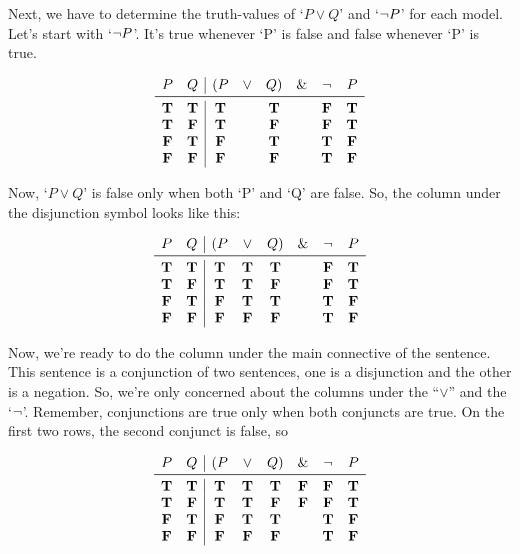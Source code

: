 \documentclass[../logic-text.tex]{subfiles}
\begin{document}
Next, we have to determine the truth-values of \enquote*{\(P \lor Q\)} and \enquote*{\(\neg P\)} for each model.
Let's start with \enquote*{\(\neg P\)}.
It's true whenever \enquote*{P} is false and false whenever \enquote*{P} is true.


\[
  \begin{array}{cc|cccccc}
    P & Q & (P & \lor & Q) & \land & \lneg & P \\ \midrule
    \true & \true & \true&& \true && \false & \true \\
    \true & \false & \true && \false && \false & \true \\
    \false & \true & \false && \true && \true & \false \\
    \false &\false & \false && \false && \true & \false \\
\end{array}
\]

Now, \enquote*{\(P \lor Q\)} is false only when both \enquote*{P} and \enquote*{Q} are false.
So, the column under the disjunction symbol looks like this:

\[
  \begin{array}{cc|cccccc}
    P & Q & (P & \lor & Q) & \land & \lneg & P \\ \midrule
    \true & \true & \true& \true & \true && \false & \true \\
    \true & \false & \true & \true & \false && \false & \true \\
    \false & \true & \false & \true & \true && \true & \false \\
    \false &\false & \false & \false & \false && \true & \false \\
\end{array}
\]

Now, we're ready to do the column under the main connective of the sentence.
This sentence is a conjunction of two sentences, one is a disjunction and the other is a negation.
So, we're only concerned about the columns under the \enquote{\(\lor\)} and the \enquote*{\(\neg\)}.
Remember, conjunctions are true only when both conjuncts are true.
On the first two rows, the second conjunct is false, so

\[
  \begin{array}{cc|cccccc}
    P & Q & (P & \lor & Q) & \land & \lneg & P \\ \midrule
    \true & \true & \true& \true & \true & \false & \false & \true \\
    \true & \false & \true & \true & \false & \false & \false & \true \\
    \false & \true & \false & \true & \true && \true & \false \\
    \false &\false & \false & \false & \false && \true & \false \\
\end{array}
\]
\end{document}
